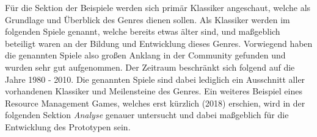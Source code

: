 Für die Sektion der Beispiele werden sich primär Klassiker angeschaut, welche als Grundlage und Überblick des Genres dienen sollen.
Als Klassiker werden im folgenden Spiele genannt, welche bereits etwas älter sind, und maßgeblich beteiligt waren an der Bildung und Entwicklung dieses Genres. Vorwiegend haben die genannten Spiele also großen Anklang in der Community gefunden und wurden sehr gut aufgenommen. Der Zeitraum beschränkt sich folgend auf die Jahre 1980 - 2010. Die genannten Spiele sind dabei lediglich ein Ausschnitt aller vorhandenen Klassiker und Meilensteine des Genres. Ein weiteres Beispiel eines Resource Management Games, welches erst kürzlich (2018) erschien, wird in der folgenden Sektion \textit{Analyse} genauer untersucht und dabei maßgeblich für die Entwicklung des Prototypen sein.



